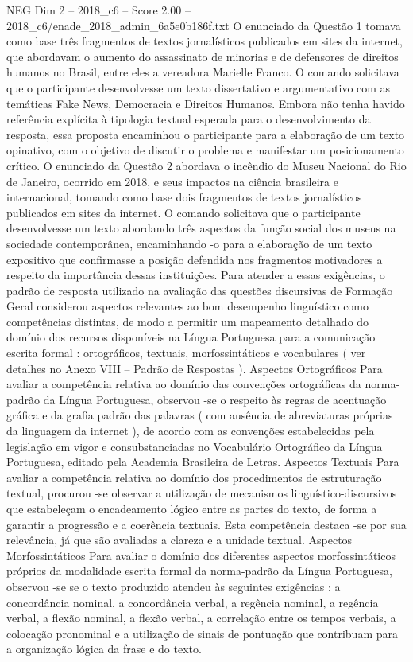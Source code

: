 \begin{textsample}{NEG Dim 2 – 2018\_c6 – Score 2.00 – 2018\_c6/enade\_2018\_admin\_6a5e0b186f.txt}
O enunciado da Questão 1 tomava como base três fragmentos de textos jornalísticos publicados em sites da internet, que abordavam o aumento do assassinato de minorias e de defensores de direitos humanos no Brasil, entre eles a vereadora Marielle Franco.
O comando solicitava que o participante desenvolvesse um texto dissertativo e argumentativo com as temáticas Fake News, Democracia e Direitos Humanos.
Embora não tenha havido referência explícita à tipologia textual esperada para o desenvolvimento da resposta, essa proposta encaminhou o participante para a elaboração de um texto opinativo, com o objetivo de discutir o problema e manifestar um posicionamento crítico.
O enunciado da Questão 2 abordava o incêndio do Museu Nacional do Rio de Janeiro, ocorrido em 2018, e seus impactos na ciência brasileira e internacional, tomando como base dois fragmentos de textos jornalísticos publicados em sites da internet.
O comando solicitava que o participante desenvolvesse um texto abordando três aspectos da função social dos museus na sociedade contemporânea, encaminhando -o para a elaboração de um texto expositivo que confirmasse a posição defendida nos fragmentos motivadores a respeito da importância dessas instituições.
Para atender a essas exigências, o padrão de resposta utilizado na avaliação das questões discursivas de Formação Geral considerou aspectos relevantes ao bom desempenho linguístico como competências distintas, de modo a permitir um mapeamento detalhado do domínio dos recursos disponíveis na Língua Portuguesa para a comunicação escrita formal : ortográficos, textuais, morfossintáticos e vocabulares ( ver detalhes no Anexo VIII – Padrão de Respostas ).
Aspectos Ortográficos Para avaliar a competência relativa ao domínio das convenções ortográficas da norma-padrão da Língua Portuguesa, observou -se o respeito às regras de acentuação gráfica e da grafia padrão das palavras ( com ausência de abreviaturas próprias da linguagem da internet ), de acordo com as convenções estabelecidas pela legislação em vigor e consubstanciadas no Vocabulário Ortográfico da Língua Portuguesa, editado pela Academia Brasileira de Letras.
Aspectos Textuais Para avaliar a competência relativa ao domínio dos procedimentos de estruturação textual, procurou -se observar a utilização de mecanismos linguístico-discursivos que estabeleçam o encadeamento lógico entre as partes do texto, de forma a garantir a progressão e a coerência textuais.
Esta competência destaca -se por sua relevância, já que são avaliadas a clareza e a unidade textual.
Aspectos Morfossintáticos Para avaliar o domínio dos diferentes aspectos morfossintáticos próprios da modalidade escrita formal da norma-padrão da Língua Portuguesa, observou -se se o texto produzido atendeu às seguintes exigências : a concordância nominal, a concordância verbal, a regência nominal, a regência verbal, a flexão nominal, a flexão verbal, a correlação entre os tempos verbais, a colocação pronominal e a utilização de sinais de pontuação que contribuam para a organização lógica da frase e do texto.

\end{textsample}
